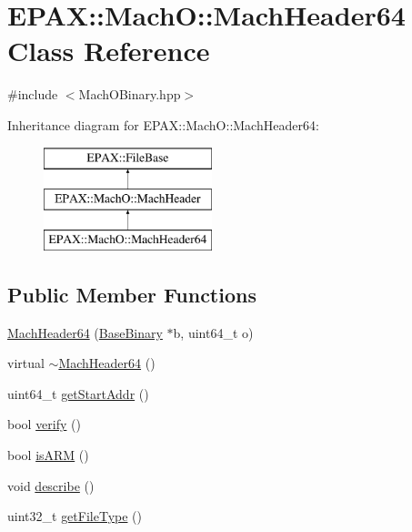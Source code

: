 \hypertarget{class_e_p_a_x_1_1_mach_o_1_1_mach_header64}{\section{\-E\-P\-A\-X\-:\-:\-Mach\-O\-:\-:\-Mach\-Header64 \-Class \-Reference}
\label{class_e_p_a_x_1_1_mach_o_1_1_mach_header64}
}


{\ttfamily \#include $<$\-Mach\-O\-Binary.\-hpp$>$}

\-Inheritance diagram for \-E\-P\-A\-X\-:\-:\-Mach\-O\-:\-:\-Mach\-Header64\-:\begin{figure}[H]
\begin{center}
\leavevmode
\includegraphics[height=3.000000cm]{class_e_p_a_x_1_1_mach_o_1_1_mach_header64}
\end{center}
\end{figure}
\subsection*{\-Public \-Member \-Functions}
\begin{DoxyCompactItemize}
\item 
\hyperlink{class_e_p_a_x_1_1_mach_o_1_1_mach_header64_ac5d9773a0ff71021b6b77e014b1c8bfd}{\-Mach\-Header64} (\hyperlink{class_e_p_a_x_1_1_base_binary}{\-Base\-Binary} $\ast$b, uint64\-\_\-t o)
\item 
virtual \hyperlink{class_e_p_a_x_1_1_mach_o_1_1_mach_header64_aa4f1dff7a22f261611849b2135fac9a3}{$\sim$\-Mach\-Header64} ()
\item 
uint64\-\_\-t \hyperlink{class_e_p_a_x_1_1_mach_o_1_1_mach_header64_a836f1c7e06d79c858b68f80a66741f36}{get\-Start\-Addr} ()
\item 
bool \hyperlink{class_e_p_a_x_1_1_mach_o_1_1_mach_header64_a6adb13e5a45f8fde528dcfea1c8ae0dd}{verify} ()
\item 
bool \hyperlink{class_e_p_a_x_1_1_mach_o_1_1_mach_header64_a8046b0bfdf50acbf3e161b317d475516}{is\-A\-R\-M} ()
\item 
void \hyperlink{class_e_p_a_x_1_1_mach_o_1_1_mach_header64_ad56f5abdcfd8bf2898d5e2cf72ad045d}{describe} ()
\item 
uint32\-\_\-t \hyperlink{class_e_p_a_x_1_1_mach_o_1_1_mach_header64_a3dd521883885b8ccc0d7731b90ba873d}{get\-File\-Type} ()
\end{DoxyCompactItemize}


